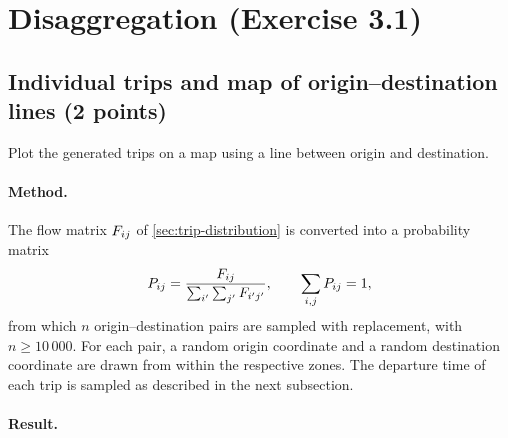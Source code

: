 \section{Disaggregation (Exercise 3.1)}\label{sec:disaggregation}

\subsection{Individual trips and map of origin--destination lines (2 points)}

\begin{qa}{Plot the generated trips on a map using a line between origin and destination.}
\end{qa}

\paragraph{Method.}
The flow matrix $F_{ij}$ of \cref{sec:trip-distribution} is converted into a probability matrix
\begin{equation}\label{eq:probability-matrix}
  P_{ij} = \frac{F_{ij}}{\sum_{i'}\sum_{j'} F_{i'j'}}, \qquad \sum_{i,j} P_{ij} = 1,
\end{equation}
from which $n$ origin--destination pairs are sampled with replacement, with $n \ge 10\,000$. For each pair, a random
origin coordinate and a random destination coordinate are drawn from within the respective zones. The departure time of
each trip is sampled as described in the next subsection.

\begin{figure}[H]
  \centering
  \caption{}
  \label{fig:trips-map}
\end{figure}

\paragraph{Result.}

